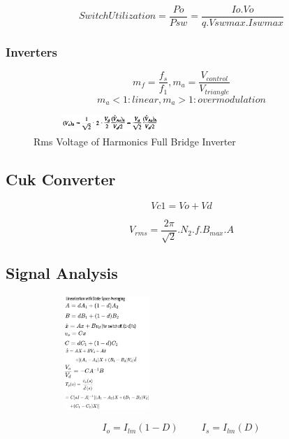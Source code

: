 \documentclass[twocolumn, ]{article}
\begin{document}
\begin{equation}
Switch Utilization= \frac{Po}{Psw}=\frac{Io.Vo}{q.Vswmax.Iswmax}
\end{equation}

\subsubsection*{Inverters}

$$ m_f=\dfrac{f_s}{f_1}, m_a=\dfrac{V_{control}}{V_{triangle}}$$
$$m_a<1: linear, m_a>1: overmodulation$$

\begin{figure}[!ht]
	\includegraphics[width=2.3in,height=0.25in]{RmsVoltageofHarmonicsFullBridgeInverter.png}
	\caption{Rms Voltage of Harmonics Full Bridge Inverter}
\end{figure}
\subsection*{\small Cuk Converter}
\small
\begin{equation}
Vc1=Vo+Vd
\end{equation}



\begin{equation}
V_{rms}=\frac{2\pi}{\sqrt{2}}.N_{2}.f.B_{max}.A
\end{equation}

\subsection*{\small Signal Analysis}
 \begin{figure}[!ht]
	\includegraphics[width=2.2in,height=1.7in]{Small_Signal.png}
\end{figure}
\begin{equation*}
I_{o}=I_{lm}(1-D) 
\hspace{1cm}
I_{s}=I_{lm}(D)
\end{equation*}
\end{document}
